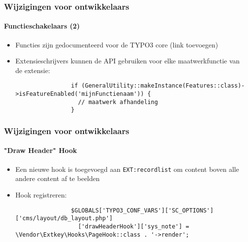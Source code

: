 \begin{frame}[fragile]
	\frametitle{Wijzigingen voor ontwikkelaars}
	\framesubtitle{Functieschakelaars (2)}

	\lstset{basicstyle=\tiny\ttfamily}

	\begin{itemize}

		\item Functies zijn gedocumenteerd voor de TYPO3 core\newline
			\small
				(link toevoegen)
			\normalsize

		\item Extensieschrijvers kunnen de API gebruiken voor elke maatwerkfunctie van
			de extensie:

			\begin{lstlisting}
				if (GeneralUtility::makeInstance(Features::class)->isFeatureEnabled('mijnFunctienaam')) {
				  // maatwerk afhandeling
				}
			\end{lstlisting}

	\end{itemize}

\end{frame}


\begin{frame}[fragile]
	\frametitle{Wijzigingen voor ontwikkelaars}
	\framesubtitle{"Draw Header" Hook}

	\lstset{basicstyle=\tiny\ttfamily}

	\begin{itemize}
		\item Een nieuwe hook is toegevoegd aan \texttt{EXT:recordlist}
			om content boven alle andere content af te beelden

		\item Hook registreren:

			\begin{lstlisting}
				$GLOBALS['TYPO3_CONF_VARS']['SC_OPTIONS']['cms/layout/db_layout.php']
				  ['drawHeaderHook']['sys_note'] = \Vendor\Extkey\Hooks\PageHook::class . '->render';
			\end{lstlisting}

	\end{itemize}

\end{frame}

